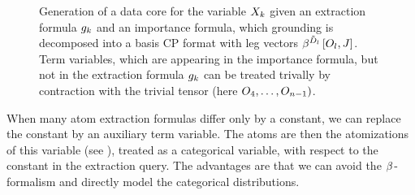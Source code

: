 


\begin{figure}[h]
    \begin{center}
        
    \end{center}
    \caption{Generation of a data core for the variable $X_{k}$ given an extraction formula $g_{k}$ and an importance formula, which grounding is decomposed into a basis CP format with leg vectors $\beta^{\tilde{D}_{l}}\left[O_{l},J\right]$.
    Term variables, which are appearing in the importance formula, but not in the extraction formula $g_{k}$ can be treated trivally by contraction with the trivial tensor (here $O_{4},\ldots,O_{n-1})$.
    }
    \label{fig:datacoreGeneration}
\end{figure}


When many atom extraction formulas differ only by a constant, we can replace the constant by an auxiliary term variable.
The atoms are then the atomizations of this variable (see ), treated as a categorical variable, with respect to the constant in the extraction query.
The advantages are that we can avoid the $\beta^{}$-formalism and directly model the categorical distributions.

